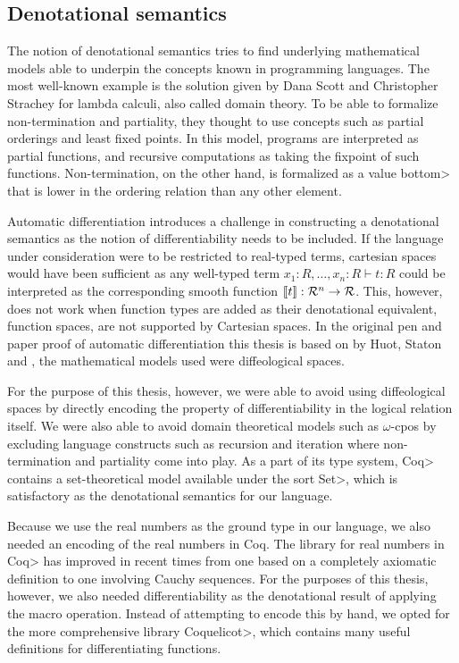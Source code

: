 \subsection{Denotational semantics}
The notion of denotational semantics tries to find underlying mathematical models able to underpin the concepts known in programming languages. The most well-known example is the solution given by Dana Scott and Christopher Strachey\cite{Scott1977} for lambda calculi, also called domain theory.
To be able to formalize non-termination and partiality, they thought to use concepts such as partial orderings and least fixed points\cite{aaby2020}.
In this model, programs are interpreted as partial functions, and recursive computations as taking the fixpoint of such functions.
Non-termination, on the other hand, is formalized as a value \<bottom> that is lower in the ordering relation than any other element.

Automatic differentiation introduces a challenge in constructing a denotational semantics as the notion of differentiability needs to be included.
If the language under consideration were to be restricted to real-typed terms, cartesian spaces would have been sufficient as any well-typed term $x_1 : R, \dots, x_n : R \vdash t : R$ could be interpreted as the corresponding smooth function $\llbracket t \rrbracket : \mathcal{R}^n \to \mathcal{R}$.
This, however, does not work when function types are added as their denotational equivalent, function spaces, are not supported by Cartesian spaces\cite{huot2020correctness}.
In the original pen and paper proof of automatic differentiation this thesis is based on by Huot, Staton and \Vakar{}\cite{huot2020correctness}, the mathematical models used were diffeological spaces.

For the purpose of this thesis, however, we were able to avoid using diffeological spaces by directly encoding the property of differentiability in the logical relation itself.
We were also able to avoid domain theoretical models such as $\omega$-cpos by excluding language constructs such as recursion and iteration where non-termination and partiality come into play.
As a part of its type system, \<Coq> contains a set-theoretical model available under the sort \<Set>, which is satisfactory as the denotational semantics for our language.

Because we use the real numbers as the ground type in our language, we also needed an encoding of the real numbers in Coq.
The library for real numbers in \<Coq> has improved in recent times from one based on a completely axiomatic definition to one involving Cauchy sequences.
For the purposes of this thesis, however, we also needed differentiability as the denotational result of applying the macro operation.
Instead of attempting to encode this by hand, we opted for the more comprehensive library \<Coquelicot>\cite{Boldo2015CoquelicotAU}, which contains many useful definitions for differentiating functions.
